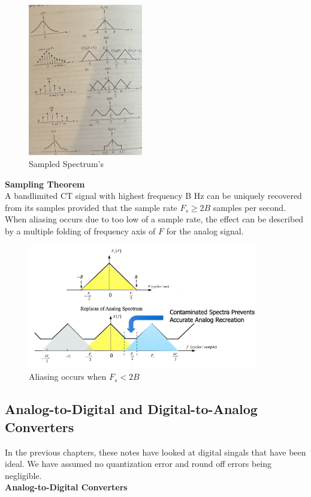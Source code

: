\documentclass{article} %
\begin{document}
	\begin{figure}[h]
	\centering
	\includegraphics[width=5cm]{spectrum}
	\caption{Sampled Spectrum's}
	\end{figure}
	\textbf{Sampling Theorem}\\
	
	A bandlimited CT signal with highest frequency B Hz can be uniquely recovered from its samples provided that the sample rate $F_s \ge 2B$ samples per second. When aliasing occurs due to too low of a sample rate, the effect can be described by a multiple folding of frequency axis of $F$ for the analog signal.
	
	\begin{figure}[h]
	\centering
	\includegraphics[width=10cm]{aliasing}
	\caption{Aliasing occurs when $F_s < 2B$}
	\end{figure}
	
	\subsection{Analog-to-Digital and Digital-to-Analog Converters}
	In the previous chapters, these notes have looked at digital singals that have been ideal. We have assumed no quantization error and round off errors being negligible. \\
	\textbf{Analog-to-Digital Converters}\\
	
\end{document}
